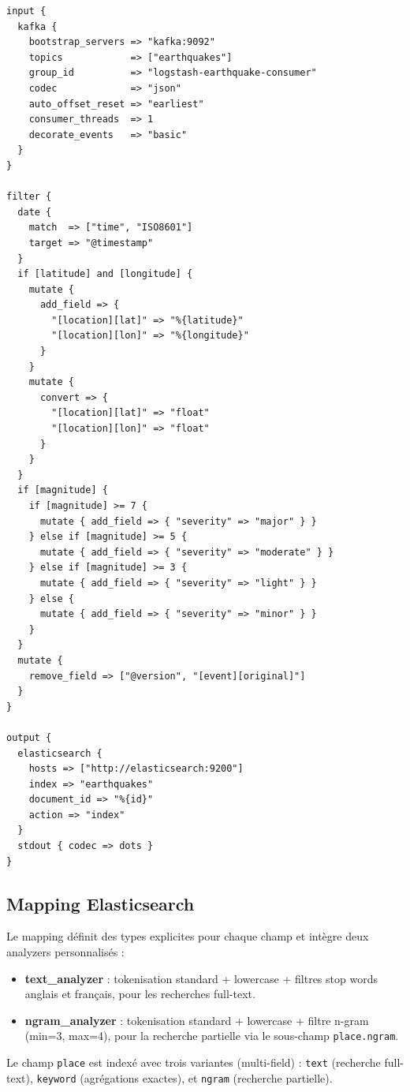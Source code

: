 \documentclass[12pt,a4paper]{article}
\begin{document}
\begin{lstlisting}[style=config, caption={Pipeline Logstash complet (pipeline.conf)}]
input {
  kafka {
    bootstrap_servers => "kafka:9092"
    topics            => ["earthquakes"]
    group_id          => "logstash-earthquake-consumer"
    codec             => "json"
    auto_offset_reset => "earliest"
    consumer_threads  => 1
    decorate_events   => "basic"
  }
}

filter {
  date {
    match  => ["time", "ISO8601"]
    target => "@timestamp"
  }
  if [latitude] and [longitude] {
    mutate {
      add_field => {
        "[location][lat]" => "%{latitude}"
        "[location][lon]" => "%{longitude}"
      }
    }
    mutate {
      convert => {
        "[location][lat]" => "float"
        "[location][lon]" => "float"
      }
    }
  }
  if [magnitude] {
    if [magnitude] >= 7 {
      mutate { add_field => { "severity" => "major" } }
    } else if [magnitude] >= 5 {
      mutate { add_field => { "severity" => "moderate" } }
    } else if [magnitude] >= 3 {
      mutate { add_field => { "severity" => "light" } }
    } else {
      mutate { add_field => { "severity" => "minor" } }
    }
  }
  mutate {
    remove_field => ["@version", "[event][original]"]
  }
}

output {
  elasticsearch {
    hosts => ["http://elasticsearch:9200"]
    index => "earthquakes"
    document_id => "%{id}"
    action => "index"
  }
  stdout { codec => dots }
}
\end{lstlisting}

\subsection{Mapping Elasticsearch}

Le mapping définit des types explicites pour chaque champ et intègre deux analyzers personnalisés :

\begin{itemize}[noitemsep]
    \item \textbf{text\_analyzer} : tokenisation standard + lowercase + filtres stop words anglais et français, pour les recherches full-text.
    \item \textbf{ngram\_analyzer} : tokenisation standard + lowercase + filtre n-gram (min=3, max=4), pour la recherche partielle via le sous-champ \texttt{place.ngram}.
\end{itemize}

Le champ \texttt{place} est indexé avec trois variantes (multi-field) : \texttt{text} (recherche full-text), \texttt{keyword} (agrégations exactes), et \texttt{ngram} (recherche partielle).
\end{document}
